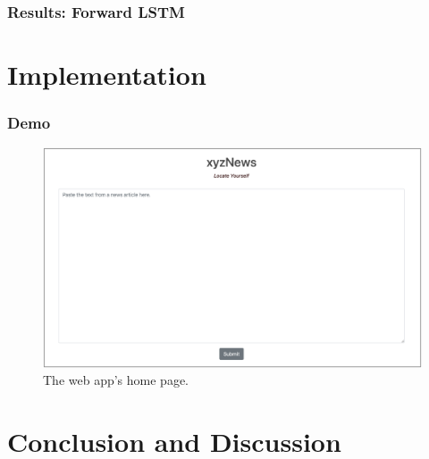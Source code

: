 \documentclass{beamer}
\begin{document}
    \begin{frame}
    	\frametitle{Results: Forward LSTM}
		
    \end{frame}


\section{Implementation}

     \begin{frame}
    	\frametitle{Demo}
    	\begin{figure}[H]
    		\includegraphics[width=\textwidth]{figures/images/web-form.png}
    		\caption{The web app's home page.}
    		\label{fig:form}
    	\end{figure}
    \end{frame}



\section{Conclusion and Discussion}
\end{document}
